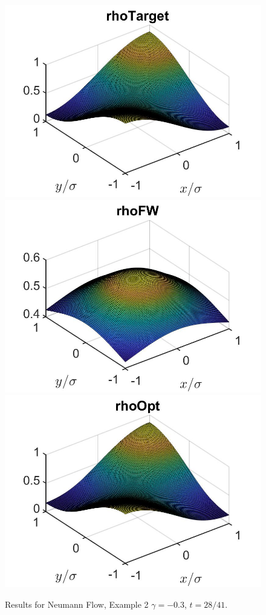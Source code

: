 \documentclass[11pt, a4paper]{article}
\theoremstyle{definition}
\begin{document}
\begin{figure}[h]
	\includegraphics[scale=0.3]{rhoHat2DN4a.jpg}
	\includegraphics[scale=0.3]{rhoFW2DN4aa.jpg}
	\includegraphics[scale=0.3]{rhoOpt2D4a.jpg}
	\caption{Results for Neumann Flow, Example 2 $\gamma = -0.3$, $t = 28/41$.}
	\label{Ex12DN4a}
\end{figure}
\end{document}
